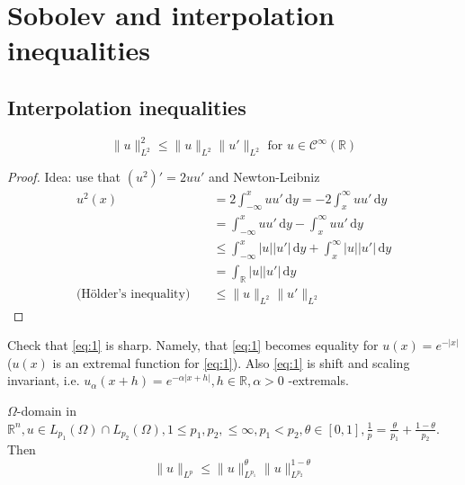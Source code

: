 \documentclass{report}
\begin{document}
\setcounter{chapter}{4}
\chapter{Sobolev and interpolation inequalities}
\section{Interpolation inequalities}

\ex{}
{
    \begin{equation} \label{eq:1}
        \|u\|_{L^{2}}^{2} \leq \|u\|_{L^{2}} \|u'\|_{L^{2}} \text{ for } u \in \mathcal{C}^{\infty}(\mathbb{R}) 
    \end{equation}
}

\begin{proof}
    Idea: use that \((u^2)' = 2uu'\) and Newton-Leibniz
    \begin{align*}
        u^2(x) &= 2 \int_{-\infty}^{x} u u' \,\mathrm{d}y = -2 \int_{x}^{\infty} u u' \,\mathrm{d}y \\
        &= \int_{-\infty}^{x} u u' \,\mathrm{d}y - \int_{x}^{\infty} u u' \,\mathrm{d}y \\
        & \leq \int_{-\infty}^{x} \vert u \vert  \vert u' \vert  \,\mathrm{d}y + \int_{x}^{\infty} \vert u \vert  \vert u' \vert \,\mathrm{d}y \\
        &= \int_{\mathbb{R}} \vert u \vert  \vert u' \vert \,\mathrm{d}y \\
        \text{(Hölder's inequality)} \quad & \leq \|u\|_{L^{2}} \|u'\|_{L^{2}}
    \end{align*}
\end{proof}

\qs{}
{
    Check that \ref{eq:1} is sharp. Namely, that \ref{eq:1} becomes equality for \(u(x) = e^{-\vert x \vert}\) (\(u(x)\) is an extremal function for \ref{eq:1}). Also \ref{eq:1} is shift and scaling invariant, i.e. \(u_{\alpha}(x+h) = e^{-\alpha|x+h|}, h \in \mathbb{R}, \alpha>0\) -extremals.
}

{
    \(\Omega\)-domain in \(\mathbb{R}^{n}, u \in L_{p_1}(\Omega) \cap L_{p_2}(\Omega), 1 \leq p_1, p_2, \leq \infty, p_1 < p_2, \theta \in [0, 1], \frac{1}{p} = \frac{\theta}{p_1} + \frac{1-\theta}{p_2}\). Then
    \begin{equation}\label{eq:2}
        \|u\|_{L^{p}} \leq \|u\|_{L^{p_1}}^{\theta} \|u\|_{L^{p_2}}^{1 - \theta}
    \end{equation} 
}
\end{document}
